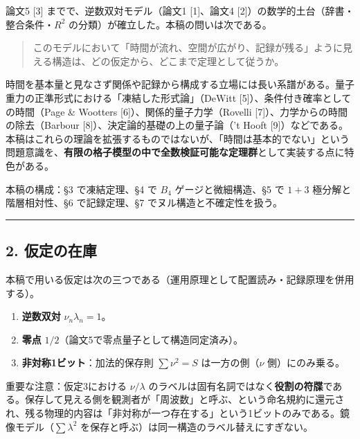\documentclass[
]{ltjsarticle}
\providecommand{\tightlist}{%
  \setlength{\itemsep}{0pt}\setlength{\parskip}{0pt}}
\begin{document}
論文5 {[}3{]} までで、逆数双対モデル（論文1 {[}1{]}、論文4
{[}2{]}）の数学的土台（辞書・整合条件・\(R^2\)
の分類）が確立した。本稿の問いは次である。

\begin{quote}
このモデルにおいて「時間が流れ、空間が広がり、記録が残る」ように見える構造は、どの仮定から、どこまで定理として従うか。
\end{quote}

時間を基本量と見なさず関係や記録から構成する立場には長い系譜がある。量子重力の正準形式における「凍結した形式論」（DeWitt
{[}5{]}）、条件付き確率としての時間（Page \& Wootters
{[}6{]}）、関係的量子力学（Rovelli
{[}7{]}）、力学からの時間の除去（Barbour
{[}8{]}）、決定論的基礎の上の量子論（'t Hooft
{[}9{]}）などである。本稿はこれらの理論を拡張するものではないが、「時間は基本的でない」という問題意識を、\textbf{有限の格子模型の中で全数検証可能な定理群}として実装する点に特色がある。

本稿の構成：§3 で凍結定理、§4 で \(B_4\) ゲージと微細構造、§5 で
\(1{+}3\) 極分解と階層相対性、§6 で記録定理、§7
でヌル構造と不確定性を扱う。

\begin{center}\rule{0.5\linewidth}{0.5pt}\end{center}

\subsection{2. 仮定の在庫}\label{ux4eeeux5b9aux306eux5728ux5eab}

本稿で用いる仮定は次の三つである（運用原理として配置読み・記録原理を併用する）。

\begin{enumerate}
\def\labelenumi{\arabic{enumi}.}
\tightlist
\item
  \textbf{逆数双対} \(\nu_n\lambda_n=1\)。
\item
  \textbf{零点} \(1/2\)（論文5で零点量子として構造同定済み）。
\item
  \textbf{非対称1ビット}：加法的保存則 \(\sum\nu^2=S\)
  は一方の側（\(\nu\) 側）にのみ乗る。
\end{enumerate}

重要な注意：仮定3における \(\nu/\lambda\)
のラベルは固有名詞ではなく\textbf{役割の符牒}である。保存して見える側を観測者が「周波数」と呼ぶ、という命名規約に還元され、残る物理的内容は「非対称が一つ存在する」という1ビットのみである。鏡像モデル（\(\sum\lambda^2\)
を保存と呼ぶ）は同一構造のラベル替えにすぎない。
\end{document}
